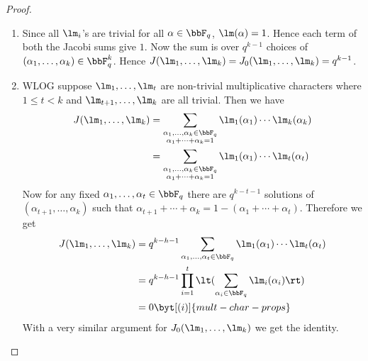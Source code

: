 \begin{proof}
  \begin{enumerate}[label=(\roman*)]
    \item Since all $\lm_i$'s are trivial for all $\alpha\in\bbF_q$, $\lm(\alpha)=1$. Hence each term of both the Jacobi sums give $1$. Now the sum is over $q^{k-1}$ choices of $(\alpha_1,\dots, \alpha_k)\in\bbF_q^k$. Hence $J(\lm_1,\dots, \lm_k)=J_0(\lm_1,\dots, \lm_k)=q^{k-1}$. 
    \item WLOG suppose $\lm_1,\dots, \lm_t$ are non-trivial multiplicative characters where $1\leq t<k$ and $\lm_{t+1},\dots, \lm_k$ are all trivial. Then we have \begin{align*}
      J(\lm_1,\dots, \lm_k)& = \sum_{\substack{\alpha_1,\dots,\alpha_k\in\bbF_q\\ \alpha_1+\cdots+\alpha_k=1}} \lm_1(\alpha_1)\cdots\lm_k(\alpha_k)\\ 
      & = \sum_{\substack{\alpha_1,\dots,\alpha_k\in\bbF_q\\ \alpha_1+\cdots+\alpha_k=1}}\lm_1(\alpha_1)\cdots \lm_t(\alpha_t)
    \end{align*}
    Now for any fixed $\alpha_1,\dots, \alpha_t\in\bbF_q$ there are $q^{k-t-1}$ solutions of $(\alpha_{t+1},\dots, \alpha_k)$ such that $\alpha_{t+1}+\cdots+\alpha_k=1-(\alpha_1+\cdots+\alpha_t)$. Therefore we get \begin{align*}
      J(\lm_1,\dots,\lm_k) & = q^{k-h-1}\sum_{\alpha_1,\dots,\alpha_t\in\bbF_q}\lm_1(\alpha_1)\cdots \lm_t(\alpha_t)\\ 
      & = q^{k-h-1}\prod_{i=1}^t \lt(\sum_{\alpha_i\in\bbF_q}\lm_i(\alpha_i)\rt)\\ 
      & = 0 \byt[(i)]{mult-char-props}
    \end{align*}With a very similar argument for $J_0(\lm_1,\dots,\lm_k)$ we get the identity. 
  \end{enumerate}
\end{proof}

